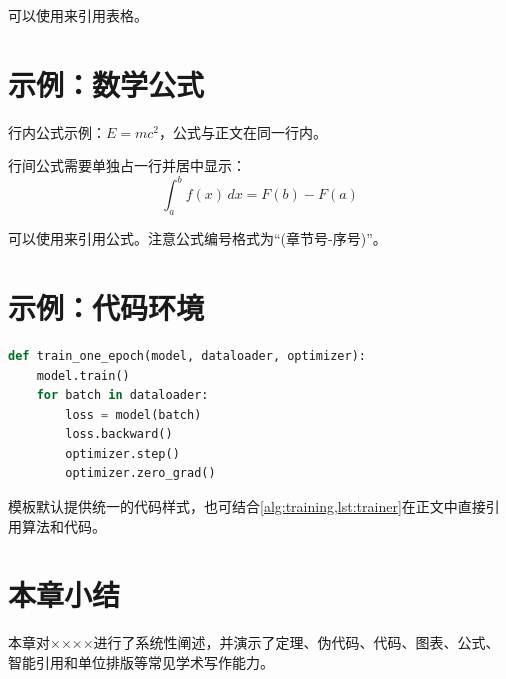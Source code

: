 可以使用来引用表格。

\section{示例：数学公式}

行内公式示例：$E=mc^2$，公式与正文在同一行内。

行间公式需要单独占一行并居中显示：
\begin{equation}
    \int_{a}^{b} f(x) \, dx = F(b) - F(a)
    \label{eq:example}
\end{equation}

可以使用来引用公式。注意公式编号格式为“(章节号-序号)”。

\section{示例：代码环境}

\begin{lstlisting}[language=Python,caption={训练脚本片段},label={lst:trainer}]
def train_one_epoch(model, dataloader, optimizer):
    model.train()
    for batch in dataloader:
        loss = model(batch)
        loss.backward()
        optimizer.step()
        optimizer.zero_grad()
\end{lstlisting}

模板默认提供统一的代码样式，也可结合\cref{alg:training,lst:trainer}在正文中直接引用算法和代码。

\section{本章小结}

本章对××××进行了系统性阐述，并演示了定理、伪代码、代码、图表、公式、智能引用和单位排版等常见学术写作能力。
